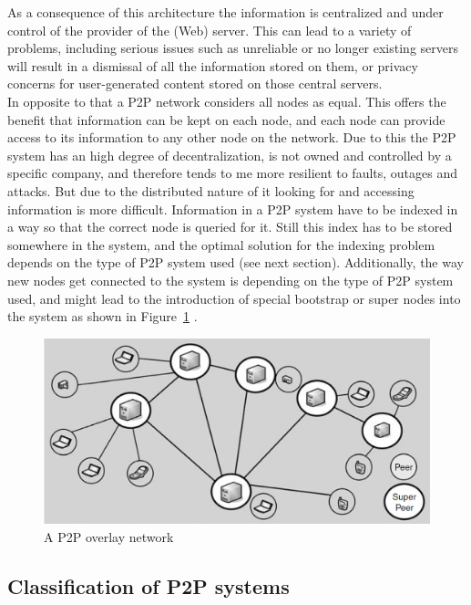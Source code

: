 As a consequence of this architecture the information is centralized and under control of the provider of the (Web) server. This can lead to a variety of problems, including serious issues such as unreliable or no longer existing servers will result in a dismissal of all the information stored on them, or privacy concerns for user-generated content stored on those central servers. \\

In opposite to that a \gls{P2P} network considers all nodes as equal. This offers the benefit that information can be kept on each node, and each node can provide access to its information to any other node on the network. Due to this the \gls{P2P} system has an high degree of decentralization, is not owned and controlled by a specific company, and therefore tends to me more resilient to faults, outages and attacks. But due to the distributed nature of it looking for and accessing information is more difficult. Information in a \gls{P2P} system have to be indexed in a way so that the correct node is queried for it. Still this index has to be stored somewhere in the system, and the optimal solution for the indexing problem depends on the type of \gls{P2P} system used (see next section). Additionally, the way new nodes get connected to the system is depending on the type of \gls{P2P} system used, and might lead to the introduction of special bootstrap or super nodes into the system as shown in Figure~\ref{fig:p2p_overlay_network} \citep{parameswaran2001p2p}.

\begin{figure}[H]
	\centering
		\includegraphics[width=0.9\columnwidth]{images/p2p_network.png}
	\caption[A \gls{P2P} overlay network]{A \gls{P2P} overlay network \citep[pg. 9]{buford2009p2p}}
\label{fig:p2p_overlay_network}
\end{figure}


\subsection{Classification of \gls{P2P} systems}
\label{sec:p2p_classification}

